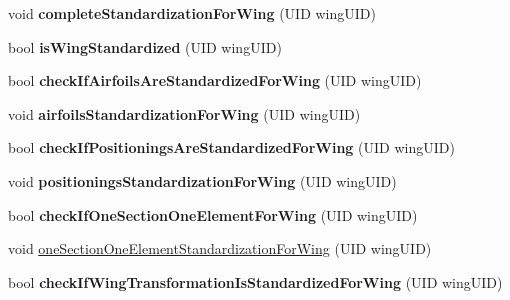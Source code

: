 \begin{DoxyCompactItemize}
\item 
\hypertarget{classcpcr_1_1AircraftTree_a384681df8357d743335e41354e3a5de3}{void {\bfseries complete\-Standardization\-For\-Wing} (U\-I\-D wing\-U\-I\-D)}\label{classcpcr_1_1AircraftTree_a384681df8357d743335e41354e3a5de3}

\item 
\hypertarget{classcpcr_1_1AircraftTree_ae49297e508d07a2afa5811d7a6d9e736}{bool {\bfseries is\-Wing\-Standardized} (U\-I\-D wing\-U\-I\-D)}\label{classcpcr_1_1AircraftTree_ae49297e508d07a2afa5811d7a6d9e736}

\item 
\hypertarget{classcpcr_1_1AircraftTree_ab303a026eff60cb94cd8e3e5eaa9fa35}{bool {\bfseries check\-If\-Airfoils\-Are\-Standardized\-For\-Wing} (U\-I\-D wing\-U\-I\-D)}\label{classcpcr_1_1AircraftTree_ab303a026eff60cb94cd8e3e5eaa9fa35}

\item 
\hypertarget{classcpcr_1_1AircraftTree_ab0656d91ceb48d16d354c5b383bc0027}{void {\bfseries airfoils\-Standardization\-For\-Wing} (U\-I\-D wing\-U\-I\-D)}\label{classcpcr_1_1AircraftTree_ab0656d91ceb48d16d354c5b383bc0027}

\item 
\hypertarget{classcpcr_1_1AircraftTree_abb58f556c2ae1c4dc50c8a770a1c3da3}{bool {\bfseries check\-If\-Positionings\-Are\-Standardized\-For\-Wing} (U\-I\-D wing\-U\-I\-D)}\label{classcpcr_1_1AircraftTree_abb58f556c2ae1c4dc50c8a770a1c3da3}

\item 
\hypertarget{classcpcr_1_1AircraftTree_a9e73f854346e14316e4fec66823ee5b9}{void {\bfseries positionings\-Standardization\-For\-Wing} (U\-I\-D wing\-U\-I\-D)}\label{classcpcr_1_1AircraftTree_a9e73f854346e14316e4fec66823ee5b9}

\item 
\hypertarget{classcpcr_1_1AircraftTree_a9bb0c237f61252f8105037e09a466a56}{bool {\bfseries check\-If\-One\-Section\-One\-Element\-For\-Wing} (U\-I\-D wing\-U\-I\-D)}\label{classcpcr_1_1AircraftTree_a9bb0c237f61252f8105037e09a466a56}

\item 
void \hyperlink{classcpcr_1_1AircraftTree_acfdc292d3b13bbd05292a5812e2c6ed1}{one\-Section\-One\-Element\-Standardization\-For\-Wing} (U\-I\-D wing\-U\-I\-D)
\item 
\hypertarget{classcpcr_1_1AircraftTree_a62fa387d7ed3540cd82626addeeff672}{bool {\bfseries check\-If\-Wing\-Transformation\-Is\-Standardized\-For\-Wing} (U\-I\-D wing\-U\-I\-D)}\label{classcpcr_1_1AircraftTree_a62fa387d7ed3540cd82626addeeff672}


\end{DoxyCompactItemize}
